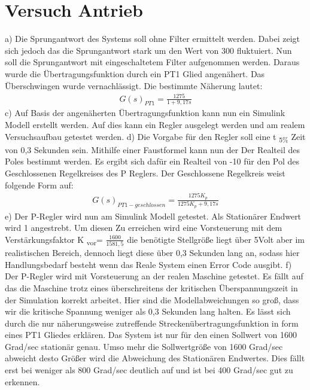 \documentclass[10pt]{scrartcl}
\begin{document}
\section{Versuch Antrieb}
a)	Die Sprungantwort des Systems soll ohne Filter ermittelt werden. Dabei zeigt sich jedoch das die Sprungantwort stark um den Wert von 300 fluktuiert.
	Nun soll die Sprungantwort mit eingeschaltetem Filter aufgenommen werden. Daraus wurde die Übertragungsfunktion durch ein PT1 Glied angenähert. Das Überschwingen wurde vernachlässigt. Die bestimmte Näherung lautet: 
\begin{align}
   G(s)_{PT1}=\frac{1275}{1+9,17s}
\end{align}
c)	Auf Basis der angenäherten Übertragungsfunktion kann nun ein Simulink Modell erstellt werden. Auf dies kann ein Regler ausgelegt werden und am realem Versuchsaufbau getestet werden.
d)	Die Vorgabe für den Regler soll eine t \textsubscript{5\%} Zeit von 0,3 Sekunden sein. Mithilfe einer Faustformel kann nun der Der Realteil des Poles bestimmt werden. Es ergibt sich dafür ein Realteil von -10 für den Pol des Geschlossenen Regelkreises des P Reglers. Der Geschlossene Regelkreis weist folgende Form auf:
\begin{align}
   G(s)_{PT1-geschlossen}=\frac{1275K_p}{1275K_p+9,17s}
\end{align}
e)	Der P-Regler wird nun am Simulink Modell getestet. Als Stationärer Endwert wird 1 angestrebt. Um diesen Zu erreichen wird eine Vorsteuerung mit dem Verstärkungsfaktor K \textsubscript{vor}= $ \frac{1600}{1581,5} $ die benötigte Stellgröße liegt über 5Volt aber im realistischen Bereich, dennoch liegt diese über 0,3 Sekunden lang an, sodass hier Handlungsbedarf besteht wenn das Reale System einen Error Code ausgibt.
f)	Der P-Regler wird mit Vorsteuerung an der realen Maschine getestet. Es fällt auf das die Maschine trotz eines überschreitens der kritischen Überspannungszeit in der Simulation korrekt arbeitet. Hier sind die Modellabweichungen so groß, dass wir die kritische Spannung weniger als 0,3 Sekunden  lang halten. Es lässt sich durch die nur näherungsweise zutreffende Streckenübertragungsfunktion in form eines PT1 Gliedes erklären. Das System ist nur für den einen Sollwert von 1600 Grad/sec stationär genau. Umso mehr die Sollwertgröße von 1600 Grad/sec abweicht desto Größer wird die Abweichung des Stationären Endwertes. Dies fällt erst bei weniger als 800 Grad/sec deutlich auf und ist bei 400 Grad/sec gut zu erkennen.
\end{document}
